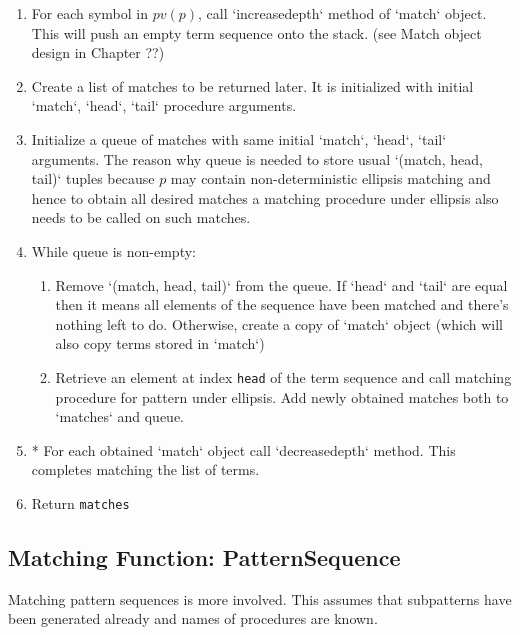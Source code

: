 \begin{enumerate}
\item
For each symbol in $pv(p)$, call `increasedepth` method of `match` object. This will push an empty term sequence onto the stack. (see Match object design in Chapter ??)
\item
Create a list of matches to be returned later. It is initialized with initial `match`, `head`, `tail` procedure arguments.
\item
Initialize a queue of matches with same initial `match`, `head`, `tail` arguments. The reason why queue is needed to store usual `(match, head, tail)` tuples because $p$ may contain non-deterministic ellipsis matching and hence to obtain all desired matches a matching procedure under ellipsis also needs to be called on such matches.
\item While queue is non-empty:
	\begin{enumerate}
	\item 
	Remove `(match, head, tail)` from the queue. If `head` and `tail` are equal then it means all elements of the sequence have been matched and there's nothing left to do.  Otherwise, create a copy of `match` object (which will also copy terms stored in `match`)
	\item
	Retrieve an element at index \texttt{head} of the term sequence and call matching procedure for pattern under ellipsis. Add newly obtained matches both to `matches` and queue.
	\end{enumerate}

\item
* For each obtained `match` object call `decreasedepth` method. This completes matching the list of terms.
\item
Return \texttt{matches}
\end{enumerate}




\subsection{Matching Function: PatternSequence}

Matching pattern sequences is more involved. This assumes that subpatterns have been generated already and names of procedures are known. 

